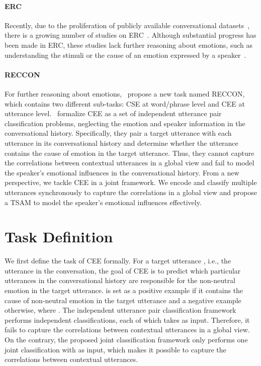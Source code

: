 \documentclass[11pt]{article}
\begin{document}
\paragraph{ERC} Recently, due to the proliferation of publicly available conversational datasets~\citep{zhou2018emotional,chen2019emotionlines,poria2019meld,chatterjee2019understanding,yuqiang2022}, there is a growing number of studies on ERC~\citep{hazarika2018icon,hazarika2018conversational,majumder2019dialoguernn,zhong2019knowledge,jiao2019higru,ghosal2020dialoguegcn,ishiwatari2020relation,ghosal2020cosmic,DBLP:conf/acl/ShenWYQ20,DBLP:conf/acl/ZhuP0ZH20,DBLP:conf/acl/HuWH20,guibon2021few,DBLP:conf/ijcai/ZhaoZL22,peng2022you}.
Although substantial progress has been made in ERC, these studies lack further reasoning about emotions, such as understanding the stimuli or the cause of an emotion expressed by a speaker~\citep{poria2021recognizing}.

\paragraph{RECCON} For further reasoning about emotions,~\citet{poria2021recognizing} propose a new task named RECCON, which contains two different sub-tasks: CSE at word/phrase level and CEE at utterance level.~\citet{poria2021recognizing} formalize CEE as a set of independent utterance pair classification problems, neglecting the emotion and speaker information in the conversational history. Specifically, they pair a target utterance with each utterance in its conversational history and determine whether the utterance contains the cause of emotion in the target utterance. Thus, they cannot capture the correlations between contextual utterances in a global view and fail to model the speaker's emotional influences in the conversational history. From a new perspective, we tackle CEE in a joint framework. We encode and classify multiple utterances synchronously to capture the correlations in a global view and propose a TSAM to model the speaker's emotional influences effectively.


\section{Task Definition}
We first define the task of CEE formally. For a target utterance , i.e., the  utterance in the conversation, the goal of CEE is to predict which particular utterances in the conversational history  are responsible for the non-neutral emotion in the target utterance.  is set as a positive example if it contains the cause of non-neutral emotion in the target utterance and a negative example otherwise, where .
The independent utterance pair classification framework~\citep{poria2021recognizing} performs  independent classifications, each of which takes  as input. Therefore, it fails to capture the correlations between contextual utterances in a global view. 
On the contrary, the proposed joint classification framework only performs one joint classification with  as input,
which makes it possible to capture the correlations between contextual utterances.
\end{document}
